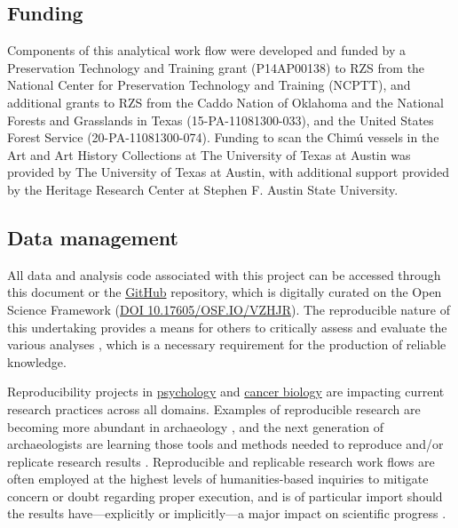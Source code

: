 \documentclass[]{interact}
\theoremstyle{plain}%
\theoremstyle{definition}
\theoremstyle{remark}
\begin{document}
\hypertarget{funding}{%
\subsection{Funding}\label{funding}}

Components of this analytical work flow were developed and funded by a
Preservation Technology and Training grant (P14AP00138) to RZS from the
National Center for Preservation Technology and Training (NCPTT), and
additional grants to RZS from the Caddo Nation of Oklahoma and the
National Forests and Grasslands in Texas (15-PA-11081300-033), and the
United States Forest Service (20-PA-11081300-074). Funding to scan the
Chimú vessels in the Art and Art History Collections at The University
of Texas at Austin was provided by The University of Texas at Austin,
with additional support provided by the Heritage Research Center at
Stephen F. Austin State University.

\hypertarget{data-management}{%
\subsection{Data management}\label{data-management}}

All data and analysis code associated with this project can be accessed
through this document or the
\href{https://seldenlab.github.io/anthro.zoo/}{GitHub} repository, which
is digitally curated on the Open Science Framework
(\href{https://osf.io/vzhjr/}{DOI 10.17605/OSF.IO/VZHJR}). The
reproducible nature of this undertaking provides a means for others to
critically assess and evaluate the various analyses
\citep{RN20915,RN20916,RN20917}, which is a necessary requirement for
the production of reliable knowledge.

Reproducibility projects in \href{https://osf.io/ezcuj/}{psychology} and
\href{https://www.cos.io/rpcb}{cancer biology} are impacting current
research practices across all domains. Examples of reproducible research
are becoming more abundant in archaeology
\citep{RN20804,RN21009,RN21001,RN9364,RN11264}, and the next generation
of archaeologists are learning those tools and methods needed to
reproduce and/or replicate research results \citep{RN21007}.
Reproducible and replicable research work flows are often employed at
the highest levels of humanities-based inquiries to mitigate concern or
doubt regarding proper execution, and is of particular import should the
results have---explicitly or implicitly---a major impact on scientific
progress \citep{RN21008}.






\end{document}
